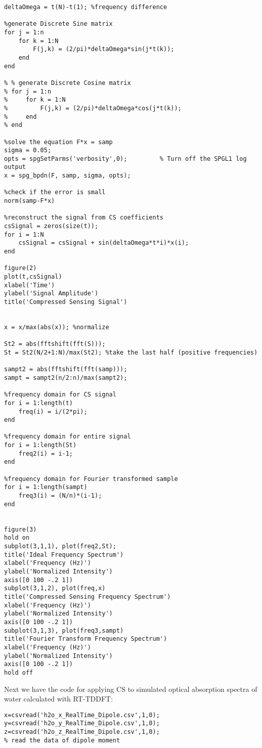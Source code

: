 \documentclass[11pt]{article}
\begin{document}
\begin{appendices}
\begin{verbatim}
deltaOmega = t(N)-t(1); %frequency difference

%generate Discrete Sine matrix
for j = 1:n
    for k = 1:N
        F(j,k) = (2/pi)*deltaOmega*sin(j*t(k));
    end
end

% % generate Discrete Cosine matrix
% for j = 1:n
%     for k = 1:N
%         F(j,k) = (2/pi)*deltaOmega*cos(j*t(k));
%     end
% end

%solve the equation F*x = samp
sigma = 0.05;
opts = spgSetParms('verbosity',0);         % Turn off the SPGL1 log output
x = spg_bpdn(F, samp, sigma, opts);

%check if the error is small
norm(samp-F*x)

%reconstruct the signal from CS coefficients
csSignal = zeros(size(t));
for i = 1:N
    csSignal = csSignal + sin(deltaOmega*t*i)*x(i);
end

figure(2)
plot(t,csSignal)
xlabel('Time')
ylabel('Signal Amplitude')
title('Compressed Sensing Signal')


x = x/max(abs(x)); %normalize

St2 = abs(fftshift(fft(S)));
St = St2(N/2+1:N)/max(St2); %take the last half (positive frequencies)

sampt2 = abs(fftshift(fft(samp)));
sampt = sampt2(n/2:n)/max(sampt2);

%frequency domain for CS signal
for i = 1:length(t)
    freq(i) = i/(2*pi);
end

%frequency domain for entire signal
for i = 1:length(St)
    freq2(i) = i-1;
end

%frequency domain for Fourier transformed sample
for i = 1:length(sampt)
    freq3(i) = (N/n)*(i-1);
end


figure(3)
hold on
subplot(3,1,1), plot(freq2,St);
title('Ideal Frequency Spectrum')
xlabel('Frequency (Hz)')
ylabel('Normalized Intensity')
axis([0 100 -.2 1])
subplot(3,1,2), plot(freq,x)
title('Compressed Sensing Frequency Spectrum')
xlabel('Frequency (Hz)')
ylabel('Normalized Intensity')
axis([0 100 -.2 1])
subplot(3,1,3), plot(freq3,sampt)
title('Fourier Transform Frequency Spectrum')
xlabel('Frequency (Hz)')
ylabel('Normalized Intensity')
axis([0 100 -.2 1])
hold off
\end{verbatim}

\par Next we have the code for applying CS to simulated optical absorption spectra of water calculated with RT-TDDFT:

\begin{verbatim}
x=csvread('h2o_x_RealTime_Dipole.csv',1,0);
y=csvread('h2o_y_RealTime_Dipole.csv',1,0);
z=csvread('h2o_z_RealTime_Dipole.csv',1,0);
% read the data of dipole moment
 


\end{verbatim}
\end{appendices}
\end{document}
